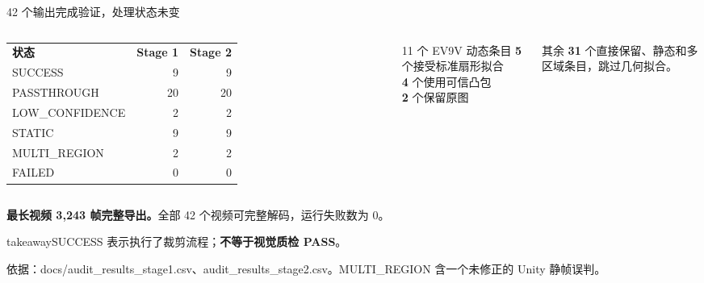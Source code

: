 \documentclass[aspectratio=169,10pt]{beamer}
\newcommand{\source}[1]{\par\vfill{\fontsize{6.1}{8}\selectfont\color{Muted}#1\par}}
\newcommand{\takeaway}[1]{\vspace{5pt}\begin{beamercolorbox}[wd=\linewidth,sep=6pt]{takeaway}\small #1\end{beamercolorbox}}
\begin{document}
\begin{frame}[t]{42 个输出完成验证，处理状态未变}
  \begin{columns}[T,onlytextwidth]
    \small
    \begin{tabularx}{\linewidth}{@{}Y r r@{}}
      \textbf{状态}&\textbf{Stage 1}&\textbf{Stage 2}\\
      SUCCESS&9&9\\
      PASSTHROUGH&20&20\\
      LOW\_CONFIDENCE&2&2\\
      STATIC&9&9\\
      MULTI\_REGION&2&2\\
      FAILED&0&0\\
      \bottomrule
    \end{tabularx}
    \begin{block}{11 个 EV9V 动态条目}
      \small\textbf{5} 个接受标准扇形拟合\\[4pt]
      \textbf{4} 个使用可信凸包\\[4pt]
      \textbf{2} 个保留原图
    \end{block}
    \small 其余 \textbf{31} 个直接保留、静态和多区域条目，跳过几何拟合。
  \end{columns}
  \vspace{4pt}\small
  \textbf{最长视频 3,243 帧完整导出。}全部 42 个视频可完整解码，运行失败数为 0。
  \takeaway{SUCCESS 表示执行了裁剪流程；\textbf{不等于视觉质检 PASS}。}
  \source{依据：docs/audit\_results\_stage1.csv、audit\_results\_stage2.csv。MULTI\_REGION 含一个未修正的 Unity 静帧误判。}
\end{frame}
\end{document}
